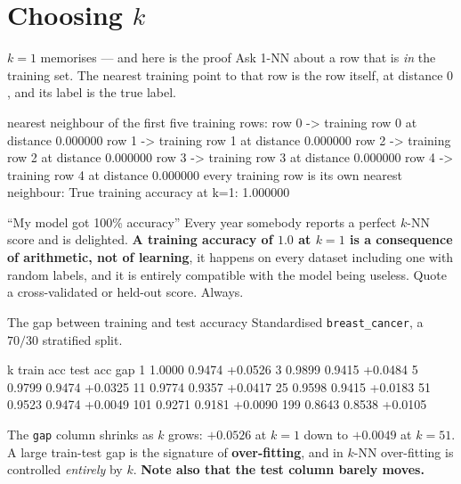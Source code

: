 \documentclass[aspectratio=169]{beamer}
\begin{document}
\section[Choosing $k$]{Choosing $k$}
\label{sec:k}

\begin{frame}[fragile,shrink=6]{$k=1$ memorises --- and here is the proof}
Ask 1-NN about a row that is \emph{in} the training set. The nearest training
point to that row is the row itself, at distance $0$, and its label is the
true label.
\begin{outblk}
nearest neighbour of the first five training rows:
  row 0 -> training row 0 at distance 0.000000
  row 1 -> training row 1 at distance 0.000000
  row 2 -> training row 2 at distance 0.000000
  row 3 -> training row 3 at distance 0.000000
  row 4 -> training row 4 at distance 0.000000
every training row is its own nearest neighbour: True
training accuracy at k=1: 1.000000
\end{outblk}
\begin{alertblock}{``My model got 100\% accuracy''}
  \footnotesize Every year somebody reports a perfect $k$-NN score and is
  delighted. \textbf{A training accuracy of $1.0$ at $k=1$ is a consequence of
  arithmetic, not of learning}, it happens on every dataset including one with
  random labels, and it is entirely compatible with the model being useless.
  Quote a cross-validated or held-out score. Always.
\end{alertblock}
\end{frame}

\begin{frame}[fragile,shrink=6]{The gap between training and test accuracy}
Standardised \texttt{breast\_cancer}, a $70/30$ stratified split.
\begin{outblk}
   k   train acc   test acc      gap
   1      1.0000     0.9474    +0.0526
   3      0.9899     0.9415    +0.0484
   5      0.9799     0.9474    +0.0325
  11      0.9774     0.9357    +0.0417
  25      0.9598     0.9415    +0.0183
  51      0.9523     0.9474    +0.0049
 101      0.9271     0.9181    +0.0090
 199      0.8643     0.8538    +0.0105
\end{outblk}
\begin{center}\small
  The \texttt{gap} column shrinks as $k$ grows: $+0.0526$ at $k=1$ down to
  $+0.0049$ at $k=51$. A large train-test gap is the signature of
  \textbf{over-fitting}, and in $k$-NN over-fitting is controlled
  \emph{entirely} by $k$. \textbf{Note also that the test column barely
  moves.}
\end{center}
\end{frame}
\end{document}

